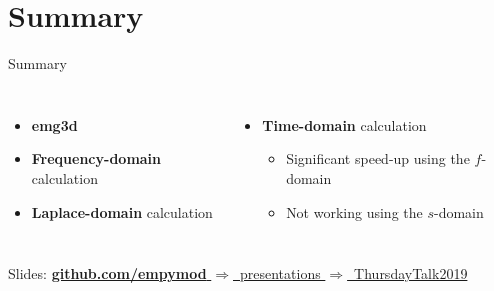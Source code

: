 \documentclass[xcolor=svgnames, aspectratio=169]{beamer}
\newcommand{\dra}{\ensuremath{\Rightarrow }~}
\begin{document}
  \section{Summary} %

  \begin{frame}%
    {Summary}
    \centering
    \begin{columns}
        \begin{itemize}\itemsep.3cm
          \item \textbf{emg3d}
          \item \textbf{Frequency-domain} calculation
          \item \textbf{Laplace-domain} calculation
        \end{itemize}
        \begin{itemize}\itemsep.3cm
          \item \textbf{Time-domain} calculation
            \begin{itemize}
              \item Significant speed-up using the $f$-domain
              \item Not working using the $s$-domain
            \end{itemize}
        \end{itemize}
    \end{columns}
    \vfill
    \alert{Slides:}
    \href{https://github.com/empymod/presentations/ThursdayTalk2019}%
    {\textbf{github.com/empymod} \dra presentations \dra ThursdayTalk2019}
  \end{frame}
\end{document}
